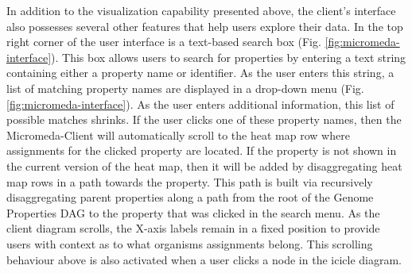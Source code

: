 In addition to the visualization capability presented above, the client's interface also possesses several other features that help users explore their data. In the top right corner of the user interface is a text-based search box (Fig. \ref{fig:micromeda-interface}). This box allows users to search for properties by entering a text string containing either a property name or identifier. As the user enters this string, a list of matching property names are displayed in a drop-down menu (Fig. \ref{fig:micromeda-interface}). As the user enters additional information, this list of possible matches shrinks. If the user clicks one of these property names, then the Micromeda-Client will automatically scroll to the heat map row where assignments for the clicked property are located. If the property is not shown in the current version of the heat map, then it will be added by disaggregating heat map rows in a path towards the property. This path is built via recursively disaggregating parent properties along a path from the root of the Genome Properties DAG to the property that was clicked in the search menu. As the client diagram scrolls, the X-axis labels remain in a fixed position to provide users with context as to what organisms assignments belong. This scrolling behaviour above is also activated when a user clicks a node in the icicle diagram.

